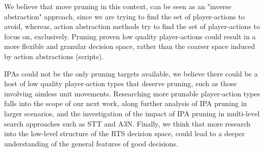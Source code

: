 \documentclass[conference]{IEEEtran}
\begin{document}
We believe that move pruning in this context, can be seen as an "inverse abstraction" approach, since we are trying to find the set of player-actions to avoid, whereas, action abstraction methods try to find the set of player-actions to focus on, exclusively. Pruning proven low quality player-actions could result in a more flexible and granular decision space, rather than the coarser space induced by action abstractions (scripts).

IPAs could not be the only pruning targets available, we believe there could be a host of low quality player-action types that deserve pruning, such as those involving aimless unit movements. Researching more prunable player-action types falls into the scope of our next work, along further analysis of IPA pruning in larger scenarios, and the investigation of the impact of IPA pruning in multi-level search approaches such as STT\cite{barriga_combining_2017} and A3N\cite{moraes_action_2018}. Finally, we think that more research into the low-level structure of the RTS decision space, could lead to a deeper understanding of the general features of good decisions.






\end{document}

